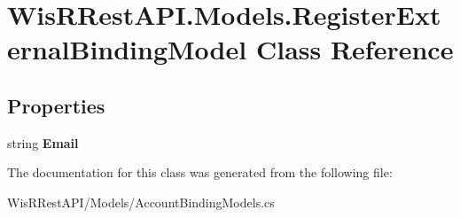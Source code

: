 \hypertarget{class_wis_r_rest_a_p_i_1_1_models_1_1_register_external_binding_model}{}\section{Wis\+R\+Rest\+A\+P\+I.\+Models.\+Register\+External\+Binding\+Model Class Reference}
\label{class_wis_r_rest_a_p_i_1_1_models_1_1_register_external_binding_model}
\subsection*{Properties}
\begin{DoxyCompactItemize}
\item 
\hypertarget{class_wis_r_rest_a_p_i_1_1_models_1_1_register_external_binding_model_ae7cd543a39b0f5333c0b4331870ac398}{}string {\bfseries Email}\label{class_wis_r_rest_a_p_i_1_1_models_1_1_register_external_binding_model_ae7cd543a39b0f5333c0b4331870ac398}

\end{DoxyCompactItemize}


The documentation for this class was generated from the following file\+:\begin{DoxyCompactItemize}
\item 
Wis\+R\+Rest\+A\+P\+I/\+Models/Account\+Binding\+Models.\+cs\end{DoxyCompactItemize}
